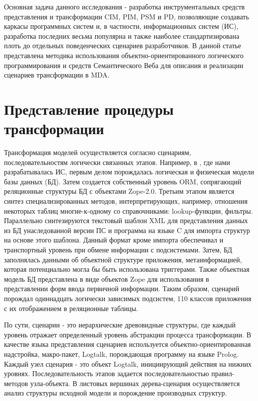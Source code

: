 \documentclass[12pt]{article}
\begin{document}
Основная задача данного исследования - разработка инструментальных средств представления и трансформации CIM, PIM, PSM и PD, позволяющие создавать каркасы программных систем и, в частности, информационных систем (ИС), разработка последних весьма популярна и также наиболее стандартизирована плоть до отдельных поведенческих сценариев разработчиков.  В данной статье представлена методика использования объектно-ориентированного логического программирования и средств Семантического Веба для описания и реализации сценариев трансформации в MDA.


\section{Представление процедуры трансформации}

Трансформация моделей осуществляется согласно сценариям, последовательностям логически связанных этапов.  Например, в \cite{paramonov}, где нами разрабатывалась ИС, первым делом порождалась логическая и физическая модели базы данных (БД).  Затем создается собственный уровень ORM, сопрягающий реляционные структуры БД с объектами Zope-2.0.  Третьим этапом является синтез специализированных методов, интерпретирующих, например, отношения некоторых таблиц многие-к-одному со справочниками: lookup-функции, фильтры.  Параллельно синтезируются текстовый шаблон XML для представления данных из БД унаследованной версии ПС и программа на языке C для импорта структур на основе этого шаблона.  Данный формат кроме импорта обеспечивал и транспортный уровень при обмене информации с подсистемами.  Затем, БД заполнялась данными об объектной структуре приложения, метаинформацией, которая потенциально могла бы быть использована триггерами.  Также объектная модель БД  представлена в виде объектов Zope для использования в представлении форм ввода первичной информации.  Таким образом, сценарий порождал одиннадцать логически зависимых подсистем, 110 классов приложения с их отображением в реляционные таблицы.

По сути, сценарии - это иерархические древовидные структуры, где каждый уровень отражает определенный уровень абстракции процесса трансформации.  В качестве языка представления сценариев используется объектно-ориентированная надстройка, макро-пакет, Logtalk, порождающая программу на языке Prolog.  Каждый узел сценария - это объект Logtalk, инициирующий действия на нижних уровнях.  Последовательность этапов задается последовательностью правил-методов узла-объекта.  В листовых вершинах дерева-сценария осуществляется анализ структуры исходной модели и порождение производных структур.
\end{document}
